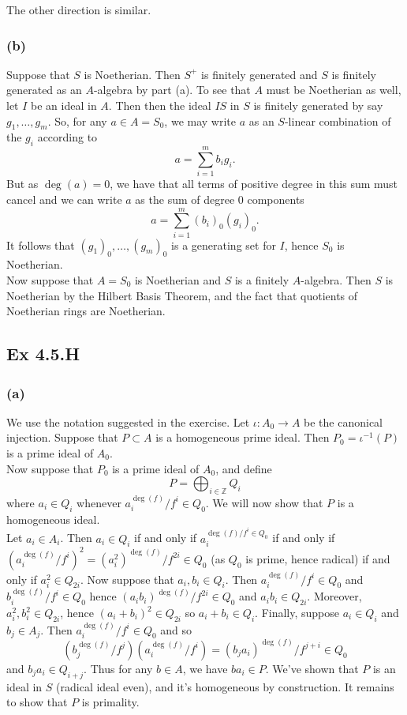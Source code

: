 \documentclass{article}
\theoremstyle{definition}
\newcommand{\Z}{\mathbb{Z}}
\begin{document}
The other direction is similar.

\subsubsection*{(b)}

Suppose that $S$ is Noetherian. Then $S^{+}$ is finitely generated and $S$ is
finitely generated as an $A$-algebra by part (a). To see that $A$ must be
Noetherian as well, let $I$ be an ideal in $A$. Then then the ideal $IS$ in $S$
is finitely generated by say $g_1, \ldots, g_m$. So, for any $a \in A = S_{0}$,
we may write $a$ as an $S$-linear combination of the $g_i$ according to 
\[
	a = \sum_{i = 1}^{m} b_i g_i.
\] 
But as $\deg(a) = 0$, we have that all terms of positive degree in this sum must
cancel and we can write $a$ as the sum of degree $0$ components
\[
	a = \sum_{i = 1}^{m} (b_i)_0 (g_i)_0.
\] 
It follows that $(g_1)_0, \ldots, (g_m)_{0}$ is a generating set for $I$, hence
$S_0$ is Noetherian. \\

Now suppose that $A = S_0$ is Noetherian and $S$ is a finitely $A$-algebra.
Then $S$ is Noetherian by the Hilbert Basis Theorem, and the fact that
quotients of Noetherian rings are Noetherian.

\subsection*{Ex 4.5.H}
\subsubsection*{(a)}

We use the notation suggested in the exercise. Let $\iota : A_0 \to A$ be the
canonical injection. Suppose that $P \subset A$ is a homogeneous prime ideal.
Then $P_0 = \iota^{-1}(P)$ is a prime ideal of $A_0$. \\

Now suppose that $P_0$ is a prime ideal of $A_0$, and define 
\[
	P = \bigoplus_{i \in \Z} Q_i
\] 
where $a_i \in Q_i$ whenever $a_i^{\deg(f)}/f^i \in Q_0$. We will now 
show that $P$ is a homogeneous ideal. \\

Let $a_i \in A_i$. Then $a_i \in Q_i$ if and only if $a_i^{\deg(f)/f^i \in
Q_0}$ if and only if $(a_i^{\deg(f)}/f^i)^2 = (a_i^{2})^{\deg(f)}/f^{2i} \in
Q_0$ (as $Q_0$ is prime, hence radical) if and only if $a_i^{2} \in Q_{2i}$.
Now suppose that $a_i, b_i \in Q_i$. Then $a_i^{\deg(f)}/f^{i} \in Q_0$ and
$b_i^{\deg(f)}/f^{i} \in Q_0$ hence $(a_ib_i)^{\deg(f)}/f^{2i} \in Q_0$ and
$a_ib_i \in Q_{2i}$. Moreover, $a_i^{2}, b_i^{2} \in Q_{2i}$, hence $(a_i +
b_i)^{2} \in Q_{2i}$ so $a_i + b_i \in Q_i$. Finally, suppose $a_i \in Q_i$ and
$b_j \in A_j$. Then $a_i^{\deg(f)}/f^i \in Q_0$ and so
\[
	\left(b_j^{\deg(f)}/f^j\right)
	\left(a_i^{\deg(f)}/f^i\right) 
	= 
	(b_j a_i)^{\deg(f)}/f^{j + i} 
	\in Q_0
\]
and $b_ja_i \in Q_{i + j}$. Thus for any $b \in A$, we have $ba_i \in P$. We've
shown that $P$ is an ideal in $S$ (radical ideal even), and it's homogeneous by
construction. It remains to show that $P$ is primality. \\
\end{document}
